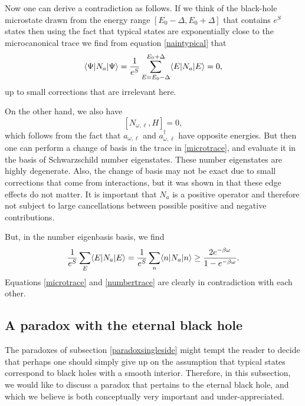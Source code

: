 \documentclass[12pt]{article}
\def\schwarzn{N}
\newcommand{\be}{\begin{equation}}
\newcommand{\ee}{\end{equation}}
\begin{document}
Now one can derive a contradiction as follows. If we think of the black-hole microstate drawn from the energy range $[E_0 - \Delta, E_0 + \Delta]$ that contains $e^{S}$ states then using the fact that typical states are exponentially close to the microcanonical trace we find from equation \eqref{naintypical} that
\be
\label{microtrace}
\langle \Psi | N_a | \Psi \rangle = {1 \over e^{S}} \sum_{E=E_0 - \Delta}^{E_0 + \Delta} \langle E | N_a | E \rangle  = 0,
\ee
up to small corrections that are irrelevant here. 

On the other hand, we also have
\be
\label{nomegcommut}
[\schwarzn_{\omega, \ell}, H] = 0,
\ee
which follows from the fact that $a_{\omega, \ell}$ and $a_{\omega, \ell}^{\dagger}$ have opposite energies. But then one can perform a change of basis in the trace in \eqref{microtrace}, and evaluate it in the basis of Schwarzschild number eigenstates.  These  number eigenstates are highly degenerate. Also, the change of basis may not be exact due to small corrections that come from interactions, but it was shown in \cite{Papadodimas:2015jra} that these edge effects do not matter. It is important that $N_a$ is a positive operator and therefore not subject to large cancellations between possible positive and negative contributions.

But, in the number eigenbasis basis, we find
\be
\label{numbertrace}
{1 \over e^{S}} \sum_{E} \langle E | N_a | E \rangle  =  {1 \over e^{S}} \sum_n \langle n | N_a | n \rangle \geq {2 e^{-\beta \omega} \over 1 - e^{-\beta \omega}}.
\ee
Equations \eqref{microtrace} and \eqref{numbertrace} are clearly in contradiction with each other.











\subsection{A paradox with the eternal black hole \label{paradoxeternal}}
The paradoxes  of subsection \ref{paradoxsingleside} might tempt the reader to decide that perhaps one should
simply give up on the assumption that typical states correspond to black holes with a smooth interior. Therefore, in this subsection, we would like to discuss a
paradox that pertains to the eternal black hole, and which we believe is both conceptually very important and under-appreciated.
\end{document}
